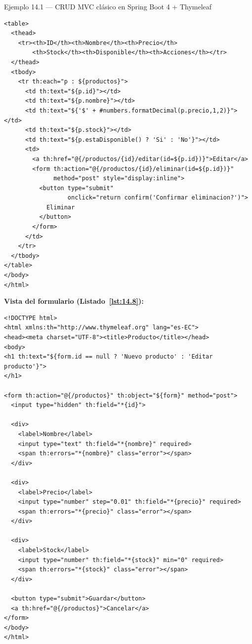 \begin{cajaejemplo}{Ejemplo 14.1 --- CRUD MVC clásico en Spring Boot 4 + Thymeleaf}
\begin{lstlisting}[style=html,caption={templates/productos/lista.html},label=lst:14.7]
<table>
  <thead>
    <tr><th>ID</th><th>Nombre</th><th>Precio</th>
        <th>Stock</th><th>Disponible</th><th>Acciones</th></tr>
  </thead>
  <tbody>
    <tr th:each="p : ${productos}">
      <td th:text="${p.id}"></td>
      <td th:text="${p.nombre}"></td>
      <td th:text="${'$' + #numbers.formatDecimal(p.precio,1,2)}"></td>
      <td th:text="${p.stock}"></td>
      <td th:text="${p.estaDisponible() ? 'Si' : 'No'}"></td>
      <td>
        <a th:href="@{/productos/{id}/editar(id=${p.id})}">Editar</a>
        <form th:action="@{/productos/{id}/eliminar(id=${p.id})}"
              method="post" style="display:inline">
          <button type="submit"
                  onclick="return confirm('Confirmar eliminacion?')">
            Eliminar
          </button>
        </form>
      </td>
    </tr>
  </tbody>
</table>
</body>
</html>
\end{lstlisting}

\textbf{Vista del formulario (Listado~\ref{lst:14.8}):}
\begin{lstlisting}[style=html,caption={templates/productos/formulario.html},label=lst:14.8]
<!DOCTYPE html>
<html xmlns:th="http://www.thymeleaf.org" lang="es-EC">
<head><meta charset="UTF-8"><title>Producto</title></head>
<body>
<h1 th:text="${form.id == null ? 'Nuevo producto' : 'Editar producto'}">
</h1>

<form th:action="@{/productos}" th:object="${form}" method="post">
  <input type="hidden" th:field="*{id}">

  <div>
    <label>Nombre</label>
    <input type="text" th:field="*{nombre}" required>
    <span th:errors="*{nombre}" class="error"></span>
  </div>

  <div>
    <label>Precio</label>
    <input type="number" step="0.01" th:field="*{precio}" required>
    <span th:errors="*{precio}" class="error"></span>
  </div>

  <div>
    <label>Stock</label>
    <input type="number" th:field="*{stock}" min="0" required>
    <span th:errors="*{stock}" class="error"></span>
  </div>

  <button type="submit">Guardar</button>
  <a th:href="@{/productos}">Cancelar</a>
</form>
</body>
</html>
\end{lstlisting}


\end{cajaejemplo}
